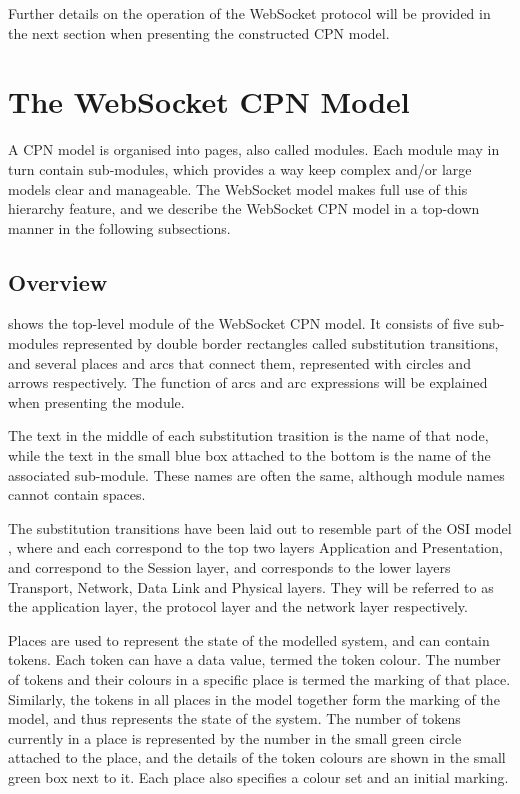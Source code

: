 Further details on the operation of the WebSocket protocol will be provided in
the next section when presenting the constructed CPN model.

\section{The WebSocket CPN Model} \label{sec:ws_cpn_model}

A CPN model is organised into pages, also called modules. Each module may in
turn contain sub-modules, which provides a way keep complex and/or large models
clear and manageable. The WebSocket model makes full use of this
hierarchy feature, and we describe the WebSocket CPN model in a top-down
manner in the following subsections.

\subsection{Overview}

	
	 shows the top-level  module of the
	WebSocket CPN model. It consists of five sub-modules represented by double
	border rectangles called substitution transitions, and several places
	and arcs that connect them, represented with circles and arrows respectively.  The
	function of arcs and arc expressions will be explained when presenting the
	 module.
	
	The	text in the middle of each substitution trasition is the name of that node,
	while the text in the small blue box attached to the bottom is the name of
	the associated sub-module. These names are often the same, although module
	names cannot contain spaces.

	The substitution transitions have been laid out to resemble part of the OSI
	model \cite{osi7}, where  and  each correspond to the top two layers Application and
	Presentation,  and 
	correspond to the Session layer, and  corresponds to the
	lower layers Transport, Network, Data Link and Physical layers. They will be
	referred to as the application layer, the protocol layer and the network layer
	respectively.
	
	Places are used to represent the state of the modelled system, and can contain
	tokens. Each token can have a data value, termed the token colour. The number
	of tokens and their colours in a specific place is termed the marking of that
	place. Similarly, the tokens in all places in the model together form the 
	marking of the model, and thus represents the state of the system. The number
	of tokens currently in a place is represented by the number in the small green
	circle attached to the place, and the details of the token colours are shown in
	the small green box next to it. Each place also specifies a colour set
	and an initial marking.
	
